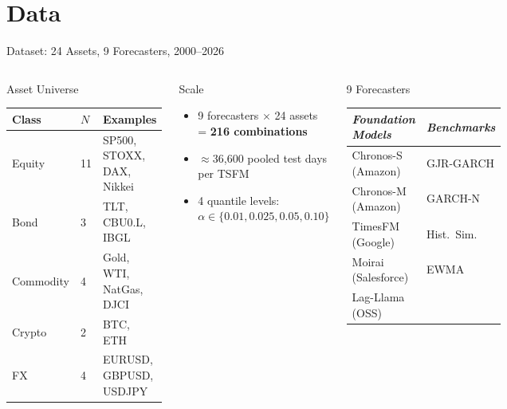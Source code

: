 \documentclass[9pt, aspectratio=169, t]{beamer}
\begin{document}
\section{Data}
\begin{frame}{Dataset: 24 Assets, 9 Forecasters, 2000--2026}
	\vspace{-0.2cm}
	{\footnotesize
	\begin{columns}[T]
		\begin{block}{Asset Universe}
		{\scriptsize
		\begin{tabular}{@{}llp{3.2cm}@{}}
		\toprule
		Class & $N$ & Examples \\
		\midrule
		Equity   & 11 & SP500, STOXX, DAX, Nikkei \\
		Bond     &  3 & TLT, CBU0.L, IBGL \\
		Commodity&  4 & Gold, WTI, NatGas, DJCI \\
		Crypto   &  2 & BTC, ETH \\
		FX       &  4 & EURUSD, GBPUSD, USDJPY \\
		\bottomrule
		\end{tabular}
		}
		\end{block}

		\begin{exampleblock}{Scale}
		\begin{itemize}\setlength{\itemsep}{0pt}
			\item 9 forecasters $\times$ 24 assets = \textbf{216 combinations}
			\item $\approx$36{,}600 pooled test days per TSFM
			\item 4 quantile levels: $\alpha \in \{0.01, 0.025, 0.05, 0.10\}$
		\end{itemize}
		\end{exampleblock}

		\begin{block}{9 Forecasters}
		{\scriptsize
		\begin{tabular}{ll}
		\toprule
		\textit{Foundation Models} & \textit{Benchmarks} \\
		\midrule
		Chronos-S (Amazon) & GJR-GARCH \\
		Chronos-M (Amazon) & GARCH-N \\
		TimesFM (Google)   & Hist.\ Sim. \\
		Moirai (Salesforce) & EWMA \\
		Lag-Llama (OSS)    & \\
		\bottomrule
		\end{tabular}
		}
		\end{block}


\end{columns}}
\end{frame}
\end{document}
